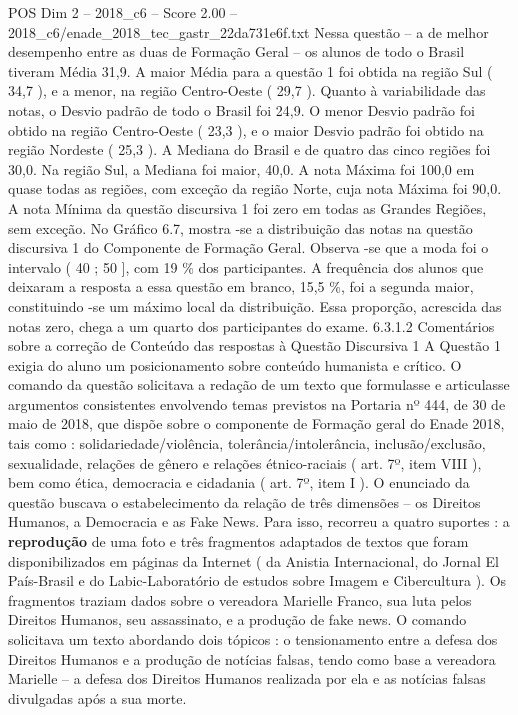 \begin{textsample}{POS Dim 2 – 2018\_c6 – Score 2.00 – 2018\_c6/enade\_2018\_tec\_gastr\_22da731e6f.txt}
Nessa questão – a de melhor desempenho entre as duas de Formação Geral – os alunos de todo o Brasil tiveram Média 31,9.
A maior Média para a questão 1 foi obtida na região Sul ( 34,7 ), e a menor, na região Centro-Oeste ( 29,7 ).
Quanto à variabilidade das notas, o Desvio padrão de todo o Brasil foi 24,9.
O menor Desvio padrão foi obtido na região Centro-Oeste ( 23,3 ), e o maior Desvio padrão foi obtido na região Nordeste ( 25,3 ).
A Mediana do Brasil e de quatro das cinco regiões foi 30,0.
Na região Sul, a Mediana foi maior, 40,0.
A nota Máxima foi 100,0 em quase todas as regiões, com exceção da região Norte, cuja nota Máxima foi 90,0.
A nota Mínima da questão discursiva 1 foi zero em todas as Grandes Regiões, sem exceção.
No Gráfico 6.7, mostra -se a distribuição das notas na questão discursiva 1 do Componente de Formação Geral.
Observa -se que a moda foi o intervalo ( 40 ; 50 ], com 19 \% dos participantes.
A frequência dos alunos que deixaram a resposta a essa questão em branco, 15,5 \%, foi a segunda maior, constituindo -se um máximo local da distribuição.
Essa proporção, acrescida das notas zero, chega a um quarto dos participantes do exame. 6.3.1.2 Comentários sobre a correção de Conteúdo das respostas à Questão Discursiva 1 A Questão 1 exigia do aluno um posicionamento sobre conteúdo humanista e crítico.
O comando da questão solicitava a redação de um texto que formulasse e articulasse argumentos consistentes envolvendo temas previstos na Portaria nº 444, de 30 de maio de 2018, que dispõe sobre o componente de Formação geral do Enade 2018, tais como : solidariedade/violência, tolerância/intolerância, inclusão/exclusão, sexualidade, relações de gênero e relações étnico-raciais ( art. 7º, item VIII ), bem como ética, democracia e cidadania ( art. 7º, item I ).
O enunciado da questão buscava o estabelecimento da relação de três dimensões – os Direitos Humanos, a Democracia e as Fake News.
Para isso, recorreu a quatro suportes : a \textbf{reprodução} de uma foto e três fragmentos adaptados de textos que foram disponibilizados em páginas da Internet ( da Anistia Internacional, do Jornal El País-Brasil e do Labic-Laboratório de estudos sobre Imagem e Cibercultura ).
Os fragmentos traziam dados sobre o vereadora Marielle Franco, sua luta pelos Direitos Humanos, seu assassinato, e a produção de fake news.
O comando solicitava um texto abordando dois tópicos : o tensionamento entre a defesa dos Direitos Humanos e a produção de notícias falsas, tendo como base a vereadora Marielle – a defesa dos Direitos Humanos realizada por ela e as notícias falsas divulgadas após a sua morte.

\end{textsample}

